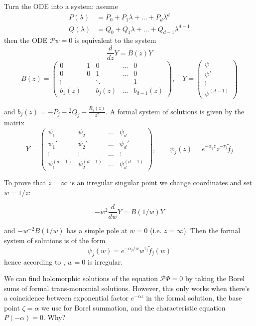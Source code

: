 \documentclass{article}
\theoremstyle{definition}
\theoremstyle{plain}
\newenvironment{verify}{\color{ForestGreen}}{\color{black}}
\begin{document}
\begin{verify}
\par
Turn the ODE into a system: assume 
\begin{align*}
P(\lambda) & = P_0 + P_1 \lambda + \ldots + P_d \lambda^d \\
Q(\lambda) & = Q_0 + Q_1 \lambda + \ldots + Q_{d-1} \lambda^{d-1}
\end{align*}
then the ODE $\mathcal{P}\psi=0$ is equivalent to the system 
    \begin{equation}
        \frac{d}{dz}Y= B(z) Y 
    \end{equation}
    \[
    B(z)=\begin{pmatrix}
            0 & 1 & 0 & \ldots & 0 \\
            0 & 0 & 1 & \ldots & 0 \\
            \vdots & &\ddots & & 1\\
            b_{1}(z) & & b_j(z) & \ldots & b_{d-1}(z)
        \end{pmatrix}, \quad Y=\begin{pmatrix}
            \psi \\
            \psi ' \\
            \vdots \\
            \psi^{(d-1)}
        \end{pmatrix}
    \]
    
 and $b_j(z)=-P_j-\frac{1}{z}Q_j-\frac{R_j(z)}{z^2}$. A formal system of solutions is given by the matrix 
\begin{equation}
    Y=\begin{pmatrix}
       \psi_1 & \psi_2 & \ldots & \psi_d  \\
       \psi_1' & \psi_2' & \ldots & \psi_d'  \\
       \vdots & \vdots  & \ldots & \vdots  \\
       \psi_1^{(d-1)} & \psi_2^{(d-1)} & \ldots & \psi_d^{(d-1)} 
    \end{pmatrix}, \qquad \psi_j(z)=e^{-\alpha_j z}z^{-\tau_j}\tilde{f}_j
\end{equation} 

To prove that $z=\infty$ is an irregular singular point we change coordinates and set $w=1/z$:  

 \begin{equation}
        -w^2 \frac{d}{dw}Y= B(1/w) Y 
    \end{equation}

and $-w^{-2}B(1/w)$ has a simple pole at $w=0$ (i.e. $z=\infty$). Then the formal system of solutions is of the form 
\[\psi_j(w)=e^{-\alpha_j/w} w^{\tau_j} \tilde{f}_j(w)\]
hence according to \cite[Definition 3.3.2]{diverg-resurg--ii}, $w=0$ is irregular.
\par
\end{verify}
We can find holomorphic solutions of the equation $\mathcal{P}\Phi = 0$ by taking the Borel sums of formal trans-monomial solutions. However, this only works when there's a coincidence between exponential factor $e^{-\alpha z}$ in the formal solution, the base point $\zeta = \alpha$ we use for Borel summation, and the characteristic equation $P(-\alpha) = 0$. Why?
\end{document}
